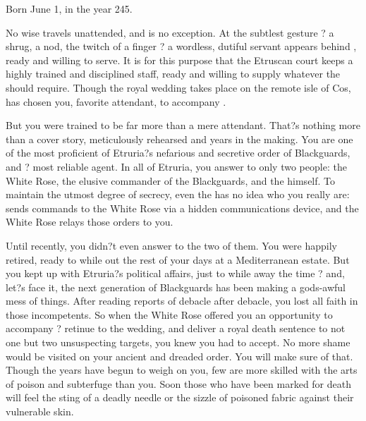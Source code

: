 \documentclass[char]{Kos}
\begin{document}
\name{\cAssassin{}}

Born June 1, in the year 245.

    No wise \cEtruriaKing{\monarch} travels unattended, and \cEtruriaKing{} is no exception. At the subtlest gesture ? a shrug, a nod, the twitch of a finger ? a wordless, dutiful servant appears behind \cEtruriaKing{\them}, ready and willing to serve. It is for this purpose that the Etruscan court keeps a highly trained and disciplined staff, ready and willing to supply whatever the \cEtruriaKing{\monarch} should require. Though the royal wedding takes place on the remote isle of Cos, \cEtruriaKing{\they} has chosen you, \cEtruriaKing{\their} favorite attendant, to accompany \cEtruriaKing{\them}.

    But you were trained to be far more than a mere attendant. That?s nothing more than a cover story, meticulously rehearsed and years in the making. You are one of the most proficient of Etruria?s nefarious and secretive order of Blackguards, and \cEtruriaKing{\Monarch} \cEtruriaKing{}? most reliable agent. In all of Etruria, you answer to only two people: the White Rose, the elusive commander of the Blackguards, and the \cEtruriaKing{\Monarch} himself. To maintain the utmost degree of secrecy, even the \cEtruriaKing{\Monarch} has no idea who you really are: \cEtruriaKing{\they} sends \cEtruriaKing{\their} commands to the White Rose via a hidden communications device, and the White Rose relays those orders to you.

    Until recently, you didn?t even answer to the two of them. You were happily retired, ready to while out the rest of your days at a Mediterranean estate. But you kept up with Etruria?s political affairs, just to while away the time ? and, let?s face it, the next generation of Blackguards has been making a gods-awful mess of things. After reading reports of debacle after debacle, you lost all faith in those incompetents. So when the White Rose offered you an opportunity to accompany \cEtruriaKing{}? retinue to the wedding, and deliver a royal death sentence to not one but two unsuspecting targets, you knew you had to accept. No more shame would be visited on your ancient and dreaded order. You will make sure of that. Though the years have begun to weigh on you, few are more skilled with the arts of poison and subterfuge than you. Soon those who have been marked for death will feel the sting of a deadly needle or the sizzle of poisoned fabric against their vulnerable skin.
\end{document}
